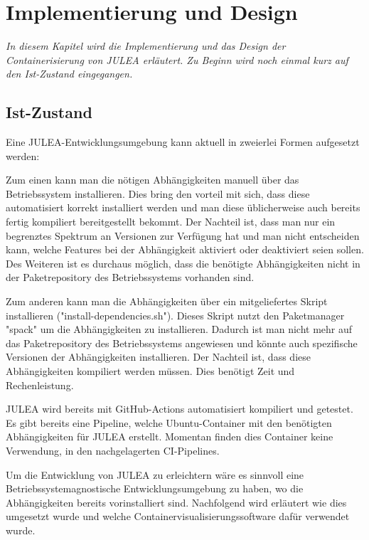 \chapter{Implementierung und Design}
\label{cha:implementation_design}

\textit{In diesem Kapitel wird die Implementierung und das Design der Containerisierung von JULEA erläutert. Zu Beginn wird noch einmal kurz auf den Ist-Zustand eingegangen.}

\section{Ist-Zustand}

Eine JULEA-Entwicklungsumgebung kann aktuell in zweierlei Formen aufgesetzt werden:

Zum einen kann man die nötigen Abhängigkeiten manuell über das Betriebssystem installieren. Dies bring den vorteil mit sich, dass diese automatisiert korrekt installiert werden und man diese üblicherweise auch bereits fertig kompiliert bereitgestellt bekommt. Der Nachteil ist, dass man nur ein begrenztes Spektrum an Versionen zur Verfügung hat und man nicht entscheiden kann, welche Features bei der Abhängigkeit aktiviert oder deaktiviert seien sollen. Des Weiteren ist es durchaus möglich, dass die benötigte Abhängigkeiten nicht in der Paketrepository des Betriebssystems vorhanden sind. 

Zum anderen kann man die Abhängigkeiten über ein mitgeliefertes Skript installieren ("install-dependencies.sh"). Dieses Skript nutzt den Paketmanager "spack" um die Abhängigkeiten zu installieren. Dadurch ist man nicht mehr auf das Paketrepository des Betriebssystems angewiesen und könnte auch spezifische Versionen der Abhängigkeiten installieren. Der Nachteil ist, dass diese Abhängigkeiten kompiliert werden müssen. Dies benötigt Zeit und Rechenleistung. 

JULEA wird bereits mit GitHub-Actions automatisiert kompiliert und getestet. Es gibt bereits eine Pipeline, welche Ubuntu-Container mit den benötigten Abhängigkeiten für JULEA erstellt. Momentan finden dies Container keine Verwendung, in den nachgelagerten CI-Pipelines. 


Um die Entwicklung von JULEA zu erleichtern wäre es sinnvoll eine Betriebssystemagnostische Entwicklungsumgebung zu haben, wo die Abhängigkeiten bereits vorinstalliert sind. Nachfolgend wird erläutert wie dies umgesetzt wurde und welche Containervisualisierungssoftware dafür verwendet wurde.

